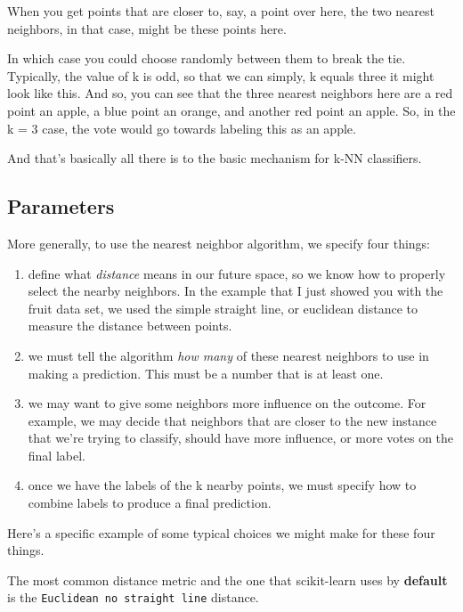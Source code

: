 \begin{multicols}{2}
When you get points that are closer to, say, a point over here, the two nearest neighbors, in that case, might be these points here. 

In which case you could choose randomly between them to break the tie. Typically, the value of k is odd, so that we can simply, k equals three it might look like this. And so, you can see that the three nearest neighbors here are a red point an apple, a blue point an orange, and another red point an apple. So, in the k = 3 case, the vote would go towards labeling this as an apple. 

And that's basically all there is to the basic mechanism for k-NN classifiers. 

\subsection{Parameters}

More generally, to use the nearest neighbor algorithm, we specify four things:

\begin{enumerate}

\item define what \emph{distance} means in our future space, so we know how to properly select the nearby neighbors. In the example that I just showed you with the fruit data set, we used the simple straight line, or euclidean distance to measure the distance between points. 

\item we must tell the algorithm \emph{how many} of these nearest neighbors to use in making a prediction. This must be a number that is at least one. 

\item we may want to give some neighbors more influence on the outcome. For example, we may decide that neighbors that are closer to the new instance that we're trying to classify, should have more influence, or more votes on the final label. 

\item once we have the labels of the k nearby points, we must specify how to combine labels to produce a final prediction. 
\end{enumerate}

Here's a specific example of some typical choices we might make for these four things. 

The most common distance metric and the one that scikit-learn uses by \textbf{default} is the \texttt{Euclidean no straight line} distance. 


\end{multicols}
